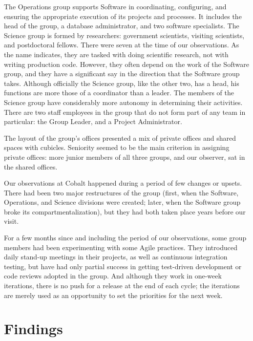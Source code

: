 \documentclass[10pt, conference, compsocconf]{IEEEtran}
\begin{document}
The Operations group supports Software in coordinating, configuring, and ensuring the appropriate execution of its projects and processes. It includes the head of the group, a database administrator, and two software specialists. The Science group is formed by researchers: government scientists, visiting scientists, and postdoctoral fellows. There were seven at the time of our observations. As the name indicates, they are tasked with doing scientific research, not with writing production code. However, they often depend on the work of the Software group, and they have a significant say in the direction that the Software group takes. Although officially the Science group, like the other two, has a head, his functions are more those of a coordinator than a leader. The members of the Science group have considerably more autonomy in determining their activities. There are two staff employees in the group that do not form part of any team in particular: the Group Leader, and a Project Administrator.

The layout of the group's offices presented a mix of private offices and shared spaces with cubicles. Seniority seemed to be the main criterion in assigning private offices: more junior members of all three groups, and our observer, sat in the shared offices.

Our observations at Cobalt happened during a period of few changes or upsets. There had been two major restructures of the group (first, when the Software, Operations, and Science divisions were created; later, when the Software group broke its compartmentalization), but they had both taken place years before our visit.

For a few months since and including the period of our observations, some group members had been experimenting with some Agile practices. They introduced daily stand-up meetings in their projects, as well as continuous integration testing, but have had only partial success in getting test-driven development or code reviews adopted in the group. And although they work in one-week iterations, there is no push for a release at the end of each cycle; the iterations are merely used as an opportunity to set the priorities for the next week.




\section{Findings}
\end{document}
